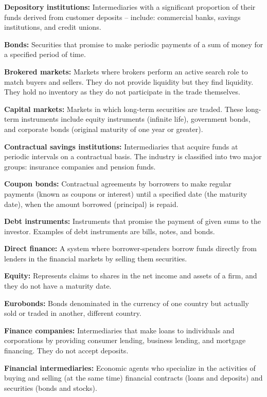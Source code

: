 \documentclass[twoside,openany]{book}
\begin{document}
\textbf{Depository institutions:} Intermediaries with a significant proportion of their funds derived from customer deposits – include: commercial banks, savings institutions, and credit unions.

\textbf{Bonds:} Securities that promise to make periodic payments of a sum of money for a specified period of time.

\textbf{Brokered markets:} Markets where brokers perform an active search role to match buyers and sellers. They do not provide liquidity but they find liquidity. They hold no inventory as they do not participate in the trade themselves.

\textbf{Capital markets:} Markets in which long-term securities are traded. These long-term instruments include equity instruments (infinite life), government bonds, and corporate bonds (original maturity of one year or greater).

\textbf{Contractual savings institutions:} Intermediaries that acquire funds at periodic intervals on a contractual basis. The industry is classified into two major groups: insurance companies and pension funds.

\textbf{Coupon bonds:} Contractual agreements by borrowers to make regular payments (known as coupons or interest) until a specified date (the maturity date), when the amount borrowed (principal) is repaid.

\textbf{Debt instruments:} Instruments that promise the payment of given sums to the investor. Examples of debt instruments are bills, notes, and bonds.

\textbf{Direct finance:} A system where borrower-spenders borrow funds directly from lenders in the financial markets by selling them securities.

\textbf{Equity:} Represents claims to shares in the net income and assets of a firm, and they do not have a maturity date.

\textbf{Eurobonds:} Bonds denominated in the currency of one country but actually sold or traded in another, different country.

\textbf{Finance companies:} Intermediaries that make loans to individuals and corporations by providing consumer lending, business lending, and mortgage financing. They do not accept deposits.

\textbf{Financial intermediaries:} Economic agents who specialize in the activities of buying and selling (at the same time) financial contracts (loans and deposits) and securities (bonds and stocks).
\end{document}
